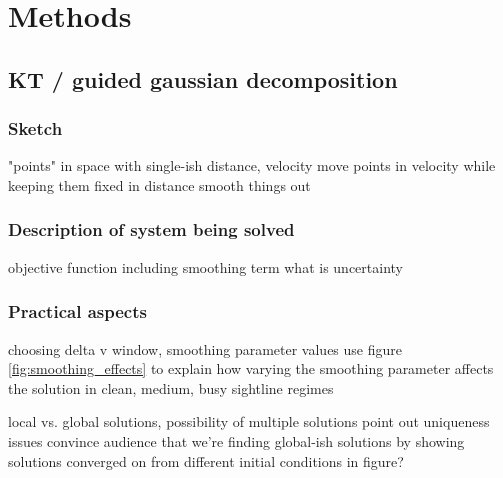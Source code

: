 \section{Methods}

\subsection{KT / guided gaussian decomposition}

\subsubsection{Sketch}
"points" in space with single-ish distance, velocity
move points in velocity while keeping them fixed in distance
smooth things out

\subsubsection{Description of system being solved}
objective function including smoothing term
what is uncertainty

\subsubsection{Practical aspects}
choosing delta v window, smoothing parameter values
use figure \ref{fig:smoothing_effects} to explain how varying the smoothing parameter affects the solution in clean, medium, busy sightline regimes

local vs. global solutions, possibility of multiple solutions
point out uniqueness issues
convince audience that we're finding global-ish solutions by showing solutions converged on from different initial conditions in figure?